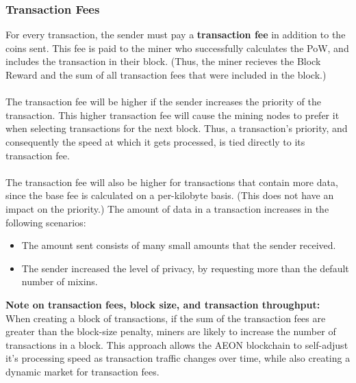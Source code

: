 \subsubsection{Transaction Fees}
For every transaction, the sender must pay a \textbf{transaction fee} in addition to the coins sent. This fee is paid to the miner who successfully calculates the PoW, and includes the transaction in their block. (Thus, the miner recieves the Block Reward and the sum of all transaction fees that were included in the block.)\\
\\
The transaction fee will be higher if the sender increases the priority of the transaction. This higher transaction fee will cause the mining nodes to prefer it when selecting transactions for the next block. Thus, a transaction's priority, and consequently the speed at which it gets processed, is tied directly to its transaction fee.\\
\\
The transaction fee will also be higher for transactions that contain more data, since the base fee is calculated on a per-kilobyte basis. (This does not have an impact on the priority.) The amount of data in a transaction increases in the following scenarios: 
\begin{itemize}
	\item The amount sent consists of many small amounts that the sender received.
	\item The sender increased the level of privacy, by requesting more than the default number of mixins.
\end{itemize}
\textbf{Note on transaction fees, block size, and transaction throughput:}\\
When creating a block of transactions, if the sum of the transaction fees are greater than the block-size penalty, miners are likely to increase the number of transactions in a block. This approach allows the AEON blockchain to self-adjust it's processing speed as transaction traffic changes over time, while also creating a dynamic market for transaction fees.\\
\\

% 


